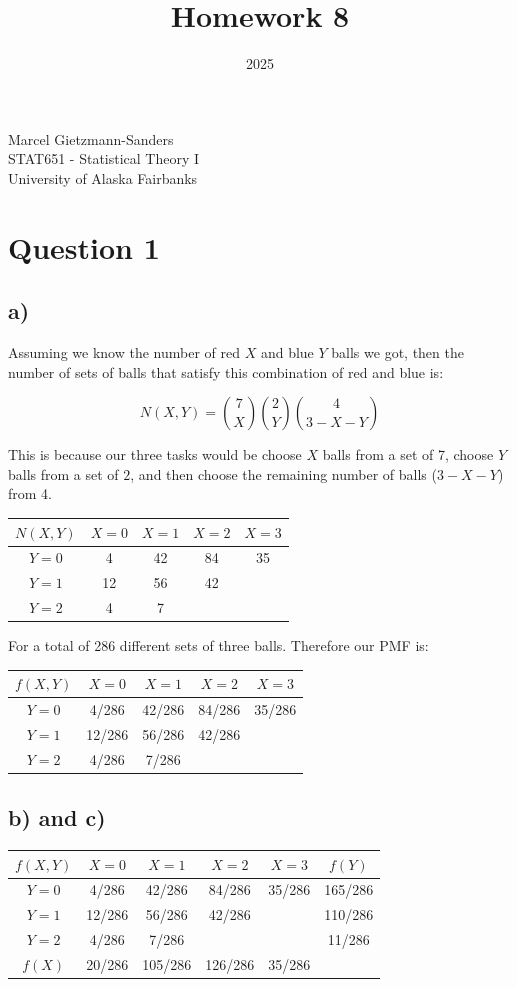 \documentclass[11pt]{article}
\title{Homework 8}
\date{2025}
\makeatletter
\renewcommand{\maketitle}{
\begin{center}

\pagestyle{empty}

{\Large \bf \@title\par}
\vspace{1cm}

{\LARGE Marcel Gietzmann-Sanders}\\[1cm]

STAT651 - Statistical Theory I \\
University of Alaska Fairbanks


\end{center}
}\makeatother
\makeatother
\begin{document}
\maketitle

\section*{Question 1}

\subsection*{a)}

Assuming we know the number of red $X$ and blue $Y$ balls we got, then the number of sets of balls that satisfy this combination of red and blue is:

$$N(X, Y) = {7 \choose X}{2 \choose Y}{4 \choose 3 - X - Y}$$

This is because our three tasks would be choose $X$ balls from a set of 7, choose $Y$ balls from a set of $2$, and then choose the remaining number of balls ($3-X-Y$) from 4.

\begin{center}
\begin{tabular}{ c| c c c c }
$N(X,Y)$ & $X=0$ & $X=1$ & $X=2$ & $X=3$ \\
 \hline
$Y=0$ & 4 & 42 & 84 & 35 \\ 
$Y=1$ & 12 & 56 & 42 &  \\
$Y=2$ & 4 & 7 &  & 
\end{tabular}
\end{center}

For a total of 286 different sets of three balls. Therefore our PMF is:

\begin{center}
\begin{tabular}{ c| c c c c }
$f(X,Y)$ & $X=0$ & $X=1$ & $X=2$ & $X=3$ \\
 \hline
$Y=0$ & 4/286 & 42/286 & 84/286 & 35/286 \\ 
$Y=1$ & 12/286 & 56/286 & 42/286 &  \\
$Y=2$ & 4/286 & 7/286 &  & 
\end{tabular}
\end{center}

\subsection*{b) and c)}

\begin{center}
\begin{tabular}{ c| c c c c | c}
$f(X,Y)$ & $X=0$ & $X=1$ & $X=2$ & $X=3$ & $f(Y)$ \\
 \hline
$Y=0$ & 4/286 & 42/286 & 84/286 & 35/286 & 165/286\\ 
$Y=1$ & 12/286 & 56/286 & 42/286 &  & 110/286 \\
$Y=2$ & 4/286 & 7/286 &  &  & 11/286 \\
\hline
$f(X)$ & 20/286 & 105/286 & 126/286 & 35/286 & 
\end{tabular}
\end{center}
\end{document}
